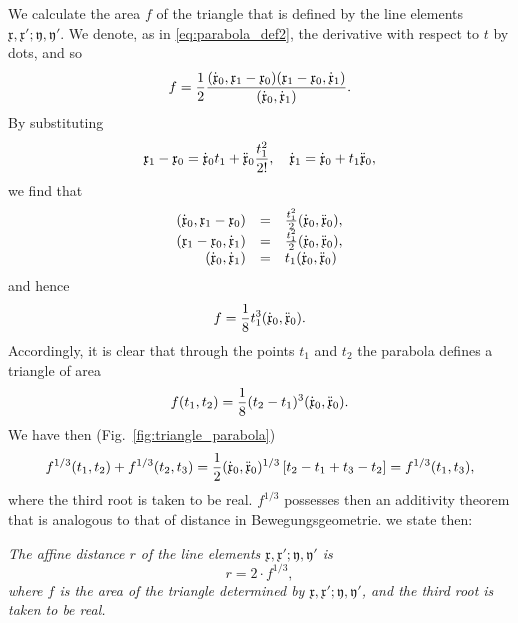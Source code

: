 \documentclass[11pt]{book} \usepackage{amssymb}
\newcommand{\myvec}[1]{\mathfrak{#1}}
\newcommand{\vecx}{\myvec{x}}
\newcommand{\vecy}{\myvec{y}}
\newcommand{\vecderiv}[1]{\dot{\myvec{#1}}}
\newcommand{\vecderivv}[1]{\ddot{\myvec{#1}}}
\begin{document}
We calculate the area $f$ of the triangle that is defined by the line elements
$\vecx,\vecx';\vecy,\vecy'$. We denote, as in 
\eqref{eq:parabola_def2}, the derivative with respect to $t$ by dots,
and so
\begin{equation}
  \label{eq:triangle_area_vector}
  f={1\over 2}{(\vecderiv{x}_0,\vecx_1-\vecx_0)(\vecx_1-\vecx_0,\vecderiv{x}_1)
    \over (\vecderiv{x}_0,\vecderiv{x}_1)}.
\end{equation}
By substituting 
\begin{equation*} 
  \vecx_1-\vecx_0=\vecderiv{x}_0t_1+\vecderivv{x}_0{t_1^2\over 2!},\quad \vecderiv{x}_1=\vecderiv{x}_0+t_1\vecderivv{x}_0,
\end{equation*}
we find that
\begin{equation*}
  \begin{array}{rcl}
    (\vecderiv{x}_0,\vecx_1-\vecx_0)&=&{t_1^2\over 2}(\vecderiv{x}_0,\vecderivv{x}_0),\\
    (\vecx_1-\vecx_0,\vecderiv{x}_1)&=&{t_1^2\over 2}(\vecderiv{x}_0,\vecderivv{x}_0),\\
    (\vecderiv{x}_0,\vecderiv{x}_1)&=&t_1(\vecderiv{x}_0,\vecderivv{x}_0)
  \end{array}
\end{equation*}
and hence
\begin{equation}
  \label{eq:triangle_area_parabola}
  f={1\over 8}t_1^3(\vecderiv{x}_0,\vecderivv{x}_0).
\end{equation}
Accordingly, it is clear that through the points $t_1$ and $t_2$ the parabola
defines a triangle of area
\begin{equation}
  \label{eq:parabola_defines_area}
  f(t_1,t_2)={1\over 8}(t_2-t_1)^3(\vecderiv{x}_0,\vecderivv{x}_0).
\end{equation}
We have then (Fig.~\ref{fig:triangle_parabola})
\begin{equation}
  \label{eq:affine_distance_additive}
  f^{1/3}(t_1,t_2)+f^{1/3}(t_2,t_3)={1\over 2}(\vecderiv{x}_0,\vecderivv{x}_0)^{1/3}\left[t_2-t_1+t_3-t_2\right]=f^{1/3}(t_1,t_3),
\end{equation}
where the third root is taken to be real. $f^{1/3}$ possesses then an 
additivity theorem that is analogous to that of distance in Bewegungsgeometrie. 
we state then:

{\em The affine distance $r$ of the line elements 
$\vecx,\vecx';\vecy,\vecy'$ is 
$$r=2\cdot f^{1/3},$$
where $f$ is the area of the triangle determined by 
$\vecx,\vecx';\vecy,\vecy'$, and the third root is taken to be
real.}
\end{document}

